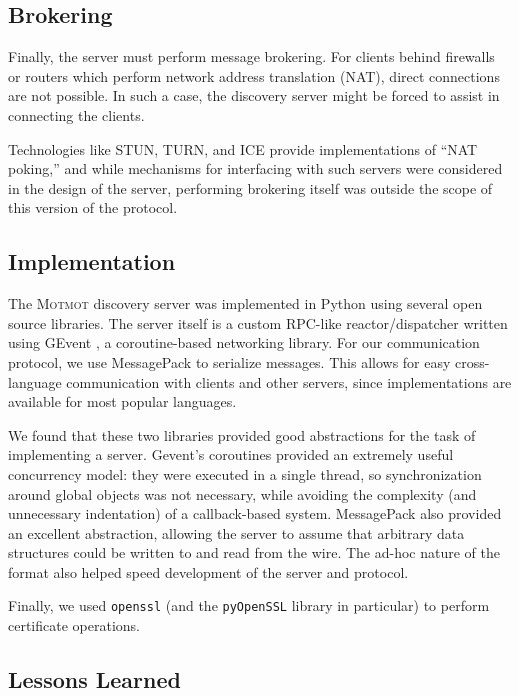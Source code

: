 \documentclass{sig-alternate}
\newcommand\Motmot{\textsc{Motmot}\xspace}
\begin{document}
\subsection{Brokering}

Finally, the server must perform message brokering. For clients behind firewalls
or routers which perform network address translation (NAT), direct connections
are not possible. In such a case, the discovery server might be forced to assist
in connecting the clients.

Technologies like STUN, TURN, and ICE provide implementations of ``NAT poking,''
and while mechanisms for interfacing with such servers were considered in the
design of the server, performing brokering itself was outside the scope of this
version of the protocol.

\subsection{Implementation}

The \Motmot discovery server was implemented in Python using several open source
libraries. The server itself is a custom RPC-like reactor/dispatcher written
using GEvent \cite{glib}, a coroutine-based networking library. For our
communication protocol, we use MessagePack \cite{msgpack} to serialize messages.
This allows for easy cross-language communication with clients and other servers,
since implementations are available for most popular languages.

We found that these two libraries provided good abstractions for the task of
implementing a server. Gevent's coroutines provided an extremely useful
concurrency model: they were executed in a single thread, so synchronization
around global objects was not necessary, while avoiding the complexity (and
unnecessary indentation) of a callback-based system. MessagePack also provided an
excellent abstraction, allowing the server to assume that arbitrary data
structures could be written to and read from the wire. The ad-hoc nature of the
format also helped speed development of the server and protocol.

Finally, we used \texttt{openssl} (and the \texttt{pyOpenSSL} library in
particular) to perform certificate operations.

\subsection{Lessons Learned}
\end{document}
